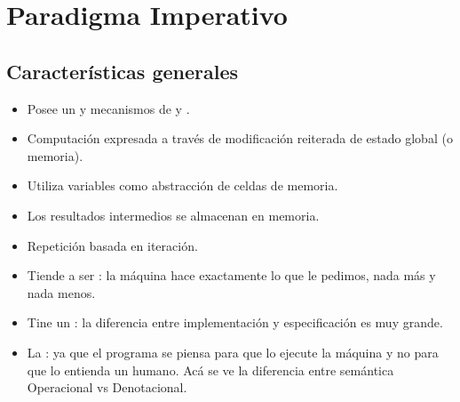 \section{Paradigma Imperativo}

\subsection{Características generales}

\begin{itemize}
  \item Posee un  y mecanismos de  y .
  \item Computación expresada a través de modificación reiterada de estado global (o memoria).
  \item Utiliza variables como abstracción de celdas de memoria.
  \item Los resultados intermedios se almacenan en memoria.
  \item Repetición basada en iteración.
  \item Tiende a ser : la máquina hace exactamente lo que le pedimos, nada más y nada menos.
  \item Tine un : la diferencia entre implementación y especificación es muy grande.
  \item La : ya que el programa se piensa para que lo ejecute la máquina y no para que lo entienda un humano. Acá se ve la diferencia entre semántica Operacional vs Denotacional.
\end{itemize}
